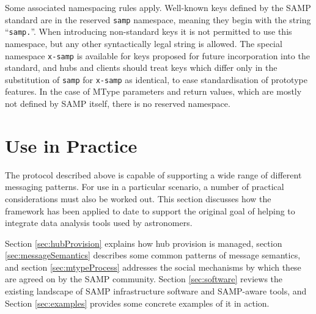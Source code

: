 \documentclass[5p]{elsarticle}
\begin{document}
Some associated namespacing rules apply.
Well-known keys defined by the SAMP standard are in the reserved {\tt samp}
namespace, meaning they begin with the string ``{\tt samp.}''.
When introducing non-standard keys it is not permitted to use this
namespace, but any other syntactically legal string is allowed.
The special namespace {\tt x-samp} is available
for keys proposed for future incorporation into the standard,
and hubs and clients should treat keys which differ 
only in the substitution of {\tt samp} for {\tt x-samp} as identical,
to ease standardisation of prototype features.
In the case of MType parameters and return values,
which are mostly not defined by SAMP itself, there is no reserved namespace.



\section{Use in Practice} \label{sec:usage}

The protocol described above is capable of supporting a wide range of
different messaging patterns.
For use in a particular scenario,
a number of practical considerations must also be worked out.
This section discusses how the framework has been applied to date
to support the original goal of helping to integrate data analysis
tools used by astronomers.

Section \ref{sec:hubProvision} explains how hub provision is managed,
section \ref{sec:messageSemantics} describes some common patterns of
message semantics, and
section \ref{sec:mtypeProcess} addresses the social mechanisms by which
these are agreed on by the SAMP community.
Section \ref{sec:software} reviews the existing landscape of
SAMP infrastructure software and SAMP-aware tools, and
Section \ref{sec:examples} provides some concrete examples of it in action.
\end{document}

